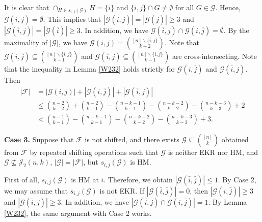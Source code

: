 \documentclass[11pt]{article}
\numberwithin{equation}{section}
\begin{document}
It is clear that $\cap_{H\in s_{i, j}(\mathcal{G})}H=\{i\}$ and $\{i,j\}\cap G\neq \emptyset$ for all $G\in \mathcal{G}$. Hence, $\mathcal{G}(\bar{i},\bar{j})= \emptyset$. This implies that $|\mathcal{G}(i,\bar{j})|=|\mathcal{G}(\bar{j})|\geq 3$ and $|\mathcal{G}(\bar{i},j)|=|\mathcal{G}(\bar{i})|\geq 3$. In addition, we have  $\mathcal{G}(\bar{i},j)\cap \mathcal{G}(i,\bar{j})=\emptyset$.  By the maximality of $|\mathcal{G}|$, we have
$\mathcal{G}(i,j)=\binom{[n]\backslash \{i,j\}}{k-2}$.
Note that $\mathcal{G}(i,\bar{j})\subseteq\binom{[n]\backslash \{i,j\}}{k-1}$ and $\mathcal{G}(\bar{i},j)\subseteq\binom{[n]\backslash \{i,j\}}{k-1}$ are cross-intersecting.
Note that the inequality in Lemma \ref{W232} holds strictly
for $\mathcal{G}(i,\bar{j})$ and  $\mathcal{G}(\bar{i},j)$. Then 
\begin{align*}
|\mathcal{F}|&=|\mathcal{G}(i,j)|+|\mathcal{G}(i,\bar{j})|+|\mathcal{G}(\bar{i}, j)|\\ &\leq \binom{n-2}{k-2}+\binom{n-2}{k-1}-\binom{n-k-1}{k-1}-\binom{n-k-2}{k-2}-\binom{n-k-3}{k-3}+2\\
&<\binom{n-1}{k-1}-\binom{n-k-1}{k-1}-\binom{n-k-2}{k-2}-\binom{n-k-3}{k-3}+3.
\end{align*}





{\bf Case 3.}
 Suppose that $\mathcal{F}$ is not shifted, and there exists $\mathcal{G} \subseteq\binom{[n]}{k}$ obtained from $\mathcal{F}$ by repeated shifting operations such that $\mathcal{G}$  is neither EKR nor HM, and  $\mathcal{G} \nsubseteq \mathcal{J}_2(n, k)$, $|\mathcal{G}|=|\mathcal{F}|$, but
$s_{i, j}(\mathcal{G})$ is HM.

First of all, $s_{i, j}(\mathcal{G})$ is HM at $i$.
Therefore, we obtain $|\mathcal{G}(\bar{i},\bar{j})|\leq 1$. By Case 2, we may assume that $s_{i, j}(\mathcal{G})$ is not EKR.  If $|\mathcal{G}(\bar{i},\bar{j})|=0$, then $|\mathcal{G}(i,\bar{j})|\geq 3$ and $|\mathcal{G}(\bar{i},j)|\geq 3$. In addition, we have  $|\mathcal{G}(\bar{i},j)\cap \mathcal{G}(i,\bar{j})|=1$. By Lemma \ref{W232}, the same argument with Case 2 works.
\end{document}
